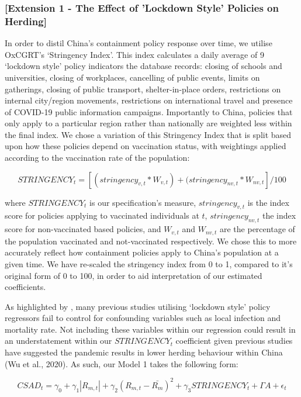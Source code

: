 \documentclass[12pt]{article}
\numberwithin{table}{section}   %
\begin{document}
\subsubsection*{[Extension 1 - The Effect of 'Lockdown Style' Policies on Herding]}

In order to distil China’s containment policy response over time, we utilise OxCGRT’s ‘Stringency Index’. This index calculates a daily average of 9 ‘lockdown style’ policy indicators the database records: closing of schools and universities, closing of workplaces, cancelling of public events, limits on gatherings, closing of public transport, shelter-in-place orders, restrictions on internal city/region movements, restrictions on international travel and presence of COVID-19 public information campaigns. Importantly to China, policies that only apply to a particular region rather than nationally are weighted less within the final index. We chose a variation of this Stringency Index that is split based upon how these policies depend on vaccination status, with weightings applied according to the vaccination rate of the population:

$$
STRINGENCY_t=[(stringency_{v,t}*W_{v,t})+(stringency_{nv,t}*W_{nv,t}]/100
$$


where $STRINGENCY_t$ is our specification’s measure, $stringency_{v,t}$ is the index score for policies applying to vaccinated individuals at $t$, $stringency_{nv,t}$ the index score for non-vaccinated based policies, and $W_{v,t}$ and $W_{nv,t}$ are the percentage of the population vaccinated and not-vaccinated respectively. We chose this to more accurately reflect how containment policies apply to China’s population at a given time. We have re-scaled the stringency index from 0 to 1, compared to it's original form of 0 to 100, in order to aid interpretation of our estimated coefficients.

As highlighted by \citet{aknin}, many previous studies utilising ‘lockdown style’ policy regressors fail to control for confounding variables such as local infection and mortality rate. Not including these variables within our regression could result in an understatement within our $STRINGENCY_t$ coefficient given previous studies have suggested the pandemic results in lower herding behaviour within China (Wu et al., 2020). As such, our Model 1 takes the following form:

\begin{equation}\label{model-2}
CSAD_t=\gamma_0+\gamma_1 |R_{m,t}|+\gamma_2 (R_{m,t}-\bar{R_m})^2+\gamma_3STRINGENCY_t+\Gamma{A}+\epsilon_t
\end{equation}
\end{document}
